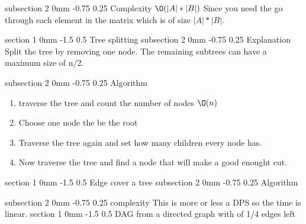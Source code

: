 \documentclass[a4paper,11pt]{article}
\makeatletter
\renewcommand{\section}{\@startsection
   {section}%
   {1}%
   {0mm}%
   {-1.5\baselineskip}%
   {0.5\baselineskip}%
   {\sffamily\bfseries\upshape\normalsize}}%
\renewcommand{\subsection}{\@startsection
   {subsection}%
   {2}%
   {0mm}%
   {-0.75\baselineskip}%
   {0.25\baselineskip}%
   {\rmfamily\normalfont\slshape\normalsize}}%
\makeatother
\begin{document}
\subsection{Complexity}
$\O(|A|*|B|)$ Since you need the go through each element in the matrix which is of size $|A|*|B| $.

\section{Tree splitting}
\subsection{Explanation}
Split the tree by removing one node. The remaining subtrees can have a maximum size of n/2.

\subsection{Algorithm}

\begin{enumerate}
\item traverse the tree and count the number of nodes $\O(n)$
\item Choose one node the be the root
\item Traverse the tree again and set how many children every node has.
\item Now traverse the tree and find a node that will make a good enought cut. 
\end{enumerate}

\section{Edge cover a tree}
\subsection{Algorithm}
\begin{algorithm}
\end{algorithm}
\subsection{complexity}
This is more or less a DPS so the time is linear.
\section{DAG from a directed graph with of 1/4 edges left}
\end{document}
